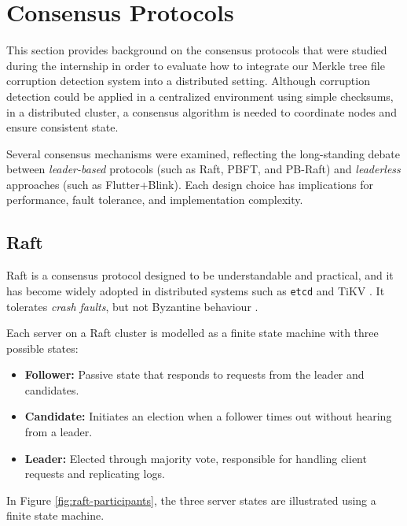 \section{Consensus Protocols}

This section provides background on the consensus protocols that were studied during the internship in order to evaluate how to integrate our Merkle tree file corruption detection system into a distributed setting.  
Although corruption detection could be applied in a centralized environment using simple checksums, in a distributed cluster, a consensus algorithm is needed to coordinate nodes and ensure consistent state.  

Several consensus mechanisms were examined, reflecting the long-standing debate between \emph{leader-based} protocols (such as Raft, PBFT, and PB-Raft) and \emph{leaderless} approaches (such as Flutter+Blink). Each design choice has implications for performance, fault tolerance, and implementation complexity.

\subsection{Raft} \label{sec:raft}

Raft \cite{raft} is a consensus protocol designed to be understandable and practical, and it has become widely adopted in distributed systems such as \texttt{etcd} \cite{etcd-raft} and TiKV \cite{tikv-raft}.
It tolerates \emph{crash faults}, but not Byzantine behaviour \cite{lamport1972byzantine}.

Each server on a Raft cluster is modelled as a finite state machine with three possible states:
\begin{itemize}
    \item \textbf{Follower:} Passive state that responds to requests from the leader and candidates.
    \item \textbf{Candidate:} Initiates an election when a follower times out without hearing from a leader.
    \item \textbf{Leader:} Elected through majority vote, responsible for handling client requests and replicating logs.
\end{itemize}

In Figure \ref{fig:raft-participants}, the three server states are illustrated using a finite state machine.

